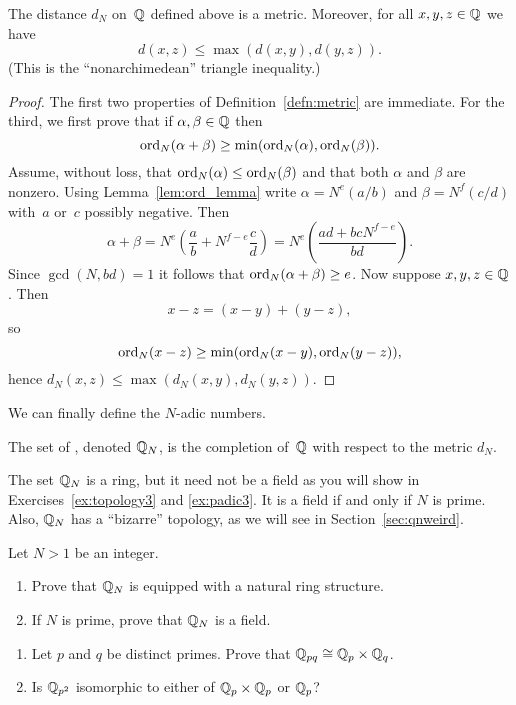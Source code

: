 \begin{proposition}\label{prop:ismetric}
The distance $d_N$ on~$\mathbb{Q}$ defined above is a metric.  Moreover, 
for all $x,y,z\in\mathbb{Q}$ we have
$$
 d(x,z) \leq \max(d(x,y),d(y,z)).
$$
(This is the ``nonarchimedean'' triangle inequality.)
\end{proposition}
\begin{proof}
The first two properties of Definition~\ref{defn:metric} are
immediate.  For the third, we first prove that if $\alpha,\beta\in\mathbb{Q}$
then 
$$
 \operatorname{ord}_N(\alpha+\beta)\geq \min(\operatorname{ord}_N(\alpha),\operatorname{ord}_N(\beta)).
$$
Assume, without loss, that $\operatorname{ord}_N(\alpha) \leq \operatorname{ord}_N(\beta)$ and
that both $\alpha$ and $\beta$ are nonzero.
Using Lemma~\ref{lem:ord_lemma} write $\alpha=N^e(a/b)$ and 
$\beta=N^f(c/d)$ with~$a$ or~$c$ possibly negative.  Then
$$
 \alpha + \beta = N^e \left(\frac{a}{b} + N^{f-e}\frac{c}{d}\right)
                = N^e \left(\frac{ad+bcN^{f-e}}{bd}\right).
$$
Since $\gcd(N,bd)=1$ it follows that $\operatorname{ord}_N(\alpha+\beta)\geq e$.
Now suppose $x,y, z\in \mathbb{Q}$.  Then
$$
 x-z = (x-y) + (y-z),
$$
so 
$$
 \operatorname{ord}_N(x-z) \geq \min (\operatorname{ord}_N(x-y), \operatorname{ord}_N(y-z)),
$$
hence $d_N(x,z) \leq \max(d_N(x,y), d_N(y,z))$.
\end{proof}

We can finally define the $N$-adic numbers.
\begin{definition}
  The set of , denoted $\mathbb{Q}_N$, is the
  completion of~$\mathbb{Q}$ with respect to the metric $d_N$.
\end{definition}
The set $\mathbb{Q}_N$ is a ring, 
but it need not be a field as you will show in Exercises~\ref{ex:topology3} and 
\ref{ex:padic3}. It is a field if and only if $N$ is prime.
Also, $\mathbb{Q}_N$ has a ``bizarre'' topology,
as we will see in Section~\ref{sec:qnweird}.  

\begin{exercise}\label{ex:topology3}
Let $N>1$ be an integer.  
\begin{enumerate}
\item Prove that $\mathbb{Q}_N$ is equipped with a natural ring structure.
\item If $N$ is prime, prove that $\mathbb{Q}_N$ is a field.
\end{enumerate}
\end{exercise}

\begin{exercise}\label{ex:topology4}
\begin{enumerate}
\item Let $p$ and $q$ be distinct primes.  Prove that 
$\mathbb{Q}_{pq} \cong \mathbb{Q}_p \times \mathbb{Q}_q$.
\item Is $\mathbb{Q}_{p^2}$ isomorphic to either of $\mathbb{Q}_p\times \mathbb{Q}_p$ or $\mathbb{Q}_p$?
\end{enumerate}

\end{exercise}




